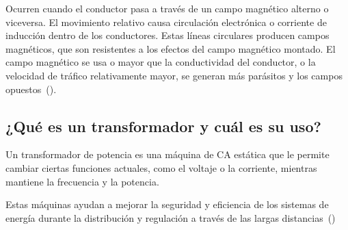 \documentclass[twocolumn, 12pt]{article}
\begin{document}
Ocurren cuando el conductor pasa a través de un campo
magnético alterno o viceversa. El movimiento relativo causa
circulación electrónica o corriente de inducción dentro de
los conductores. Estas líneas circulares producen campos
magnéticos, que son resistentes a los efectos del campo
magnético montado. El campo magnético se usa o mayor que la
conductividad del conductor, o la velocidad de tráfico
relativamente mayor, se generan más parásitos y los campos
opuestos~(\cite{FenomenosElectromagneticos}).

\subsection*{¿Qué es un transformador y cuál es su uso?}

Un transformador de potencia es una máquina de CA estática
que le permite cambiar ciertas funciones actuales, como el
voltaje o la corriente, mientras mantiene la frecuencia y
la potencia.

Estas máquinas ayudan a mejorar la seguridad y eficiencia
de los sistemas de energía durante la distribución y
regulación a través de las largas
distancias~(\cite{FenomenosElectromagneticos})

\newpage

\printbibliography
\end{document}
